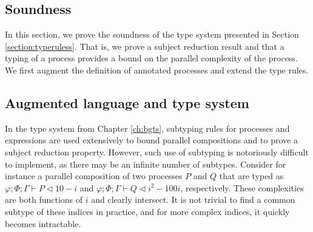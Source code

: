 
% 

\subsection{Soundness}\label{sec:tcsoundness}
In this section, we prove the soundness of the type system presented in Section \ref{section:typeruless}. That is, we prove a subject reduction result and that a typing of a process provides a bound on the parallel complexity of the process. We first augment the definition of annotated processes and extend the type rules.
%
\subsection{Augmented language and type system}
In the type system from Chapter \ref{ch:bgts}, subtyping rules for processes and expressions are used extensively to bound parallel compositions and to prove a subject reduction property. However, such use of subtyping is notoriously difficult to implement, as there may be an infinite number of subtypes. Consider for instance a parallel composition of two processes $P$ and $Q$ that are typed as $\varphi;\Phi;\Gamma\vdash P \triangleleft 10 - i$ and $\varphi;\Phi;\Gamma\vdash Q \triangleleft i^2 - 100i$, respectively. These complexities are both functions of $i$ and clearly intersect. It is not trivial to find a common subtype of these indices in practice, and for more complex indices, it quickly becomes intractable.\\

